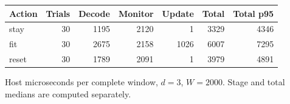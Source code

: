 \begin{center}\small
\begin{tabular}{lrrrrrr}
\hline
Action & Trials & Decode & Monitor & Update & Total & Total p95 \\
\hline
stay & 30 & 1195 & 2120 & 1 & 3329 & 4346 \\
fit & 30 & 2675 & 2158 & 1026 & 6007 & 7295 \\
reset & 30 & 1789 & 2091 & 1 & 3979 & 4891 \\
\hline\end{tabular}
\par\smallskip\parbox{0.93\linewidth}{\small Host microseconds per complete window, $d=3$, $W=2000$. Stage and total medians are computed separately.}
\end{center}
